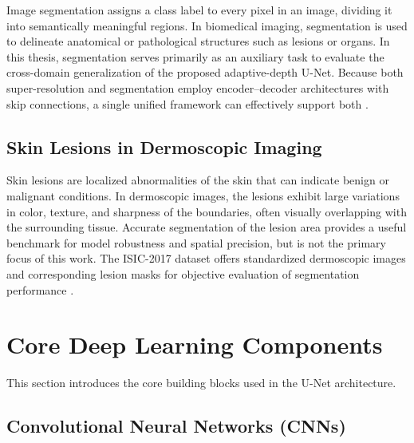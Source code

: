 Image segmentation assigns a class label to every pixel in an image, dividing it into semantically meaningful regions. 
In biomedical imaging, segmentation is used to delineate anatomical or pathological structures such as lesions or organs. 
In this thesis, segmentation serves primarily as an auxiliary task to evaluate the cross-domain generalization of the proposed adaptive-depth U-Net. 
Because both super-resolution and segmentation employ encoder–decoder architectures with skip connections, a single unified framework can effectively support both \cite{ronneberger2015unet,long2015fcn}.

\subsection{Skin Lesions in Dermoscopic Imaging}
Skin lesions are localized abnormalities of the skin that can indicate benign or malignant conditions. 
In dermoscopic images, the lesions exhibit large variations in color, texture, and sharpness of the boundaries, often visually overlapping with the surrounding tissue. 
Accurate segmentation of the lesion area provides a useful benchmark for model robustness and spatial precision, but is not the primary focus of this work. 
The ISIC-2017 dataset offers standardized dermoscopic images and corresponding lesion masks for objective evaluation of segmentation performance \cite{phan2023skin}.

\section{Core Deep Learning Components}
\label{sec:prelim_cnn}

This section introduces the core building blocks used in the U-Net architecture.

\subsection{Convolutional Neural Networks (CNNs)}


